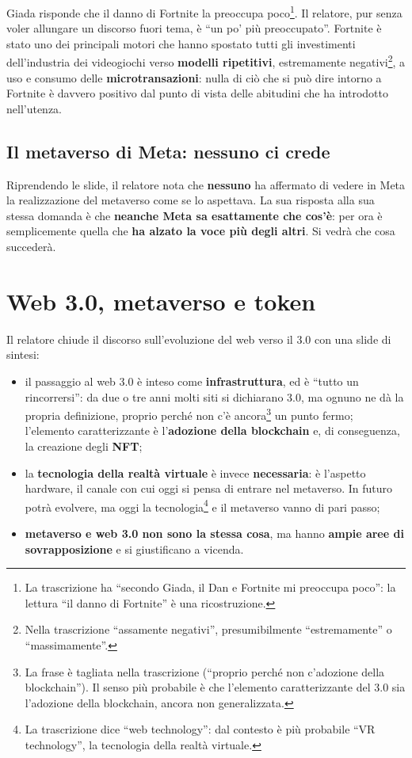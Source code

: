 Giada risponde che il danno di Fortnite la preoccupa poco\footnote{La
trascrizione ha ``secondo Giada, il Dan e Fortnite mi preoccupa poco'': la
lettura ``il danno di Fortnite'' è una ricostruzione.}. Il relatore, pur senza
voler allungare un discorso fuori tema, è ``un po' più preoccupato''. Fortnite è
stato uno dei principali motori che hanno spostato tutti gli investimenti
dell'industria dei videogiochi verso \textbf{modelli ripetitivi}, estremamente
negativi\footnote{Nella trascrizione ``assamente negativi'', presumibilmente
``estremamente'' o ``massimamente''.}, a uso e consumo delle
\textbf{microtransazioni}: nulla di ciò che si può dire intorno a Fortnite è
davvero positivo dal punto di vista delle abitudini che ha introdotto
nell'utenza.

\subsection{Il metaverso di Meta: nessuno ci crede}

Riprendendo le slide, il relatore nota che \textbf{nessuno} ha affermato di
vedere in Meta la realizzazione del metaverso come se lo aspettava. La sua
risposta alla sua stessa domanda è che \textbf{neanche Meta sa esattamente che
cos'è}: per ora è semplicemente quella che \textbf{ha alzato la voce più degli
altri}. Si vedrà che cosa succederà.

\section{Web 3.0, metaverso e token}
\label{z8:sec:web3}

Il relatore chiude il discorso sull'evoluzione del web verso il 3.0 con una
slide di sintesi:
\begin{itemize}
  \item il passaggio al web 3.0 è inteso come \textbf{infrastruttura}, ed è
        ``tutto un rincorrersi'': da due o tre anni molti siti si dichiarano 3.0,
        ma ognuno ne dà la propria definizione, proprio perché non c'è
        ancora\footnote{La frase è tagliata nella trascrizione (``proprio perché
        non c'adozione della blockchain''). Il senso più probabile è che
        l'elemento caratterizzante del 3.0 sia l'adozione della blockchain,
        ancora non generalizzata.} un punto fermo; l'elemento caratterizzante è
        l'\textbf{adozione della blockchain} e, di conseguenza, la creazione
        degli \textbf{NFT};
  \item la \textbf{tecnologia della realtà virtuale} è invece
        \textbf{necessaria}: è l'aspetto hardware, il canale con cui oggi si
        pensa di entrare nel metaverso. In futuro potrà evolvere, ma oggi la
        tecnologia\footnote{La trascrizione dice ``web technology'': dal contesto
        è più probabile ``VR technology'', la tecnologia della realtà
        virtuale.} e il metaverso vanno di pari passo;
  \item \textbf{metaverso e web 3.0 non sono la stessa cosa}, ma hanno
        \textbf{ampie aree di sovrapposizione} e si giustificano a vicenda.
\end{itemize}

